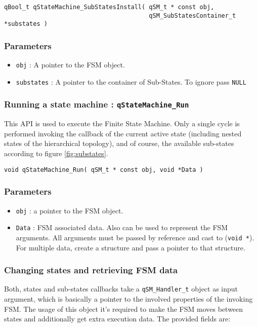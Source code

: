 \begin{lstlisting}[style=CStyle]
qBool_t qStateMachine_SubStatesInstall( qSM_t * const obj, 
                                        qSM_SubStatesContainer_t *substates )
\end{lstlisting}

\subsubsection*{Parameters}
\begin{itemize}
    \item \lstinline{obj} : A pointer to the FSM object.
    \item \lstinline{substates} : A pointer to the container of Sub-States. To ignore pass \lstinline{NULL}   
\end{itemize}  

\subsubsection{Running a state machine : \texorpdfstring{\lstinline{qStateMachine_Run}}{qStateMachine_Run} }
This API  is used to execute the Finite State Machine. Only a single cycle is performed invoking the callback of the current active state (including nested states of the hierarchical topology), and of course, the available sub-states according to figure \ref{fig:substates}. 
\medskip

\begin{lstlisting}[style=CStyle]
void qStateMachine_Run( qSM_t * const obj, void *Data )
\end{lstlisting}

\subsubsection*{Parameters}
\begin{itemize}
    \item \lstinline{obj} : a pointer to the FSM object.
    \item \lstinline{Data} : FSM associated data. Also can be used to represent the FSM arguments. All arguments must be passed by reference and cast to (\lstinline{void *}). For multiple data, create a structure and pass a pointer to that structure.  
\end{itemize}  

\subsubsection{Changing states and retrieving FSM data}
Both, states and sub-states callbacks take a \lstinline{qSM_Handler_t}  object as input argument, which is basically a pointer to the involved properties of the invoking FSM. The usage of this object it's required to make the FSM moves between states and additionally get extra execution data. The provided fields are:

